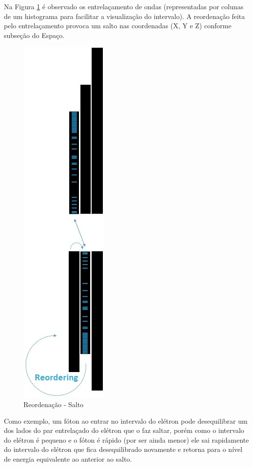 Na Figura \ref{fig:consciousness_space_subconscious_observation_jump} é observado os entrelaçamento de ondas (representadas por colunas de um histograma para facilitar a visualização do intervalo). A reordenação feita pelo entrelaçamento provoca um salto nas coordenadas (X, Y e Z) conforme subseção do Espaço.
	\begin{figure}[H]
	\caption{Reordenação - Salto}
	\label{fig:consciousness_space_subconscious_observation_jump}
	\centering
	\includegraphics[scale=.53]{sections/images/consciousness_space_subconscious_observation_jump.jpg}
	\end{figure}

Como exemplo, um fóton ao entrar no intervalo do elétron pode desequilibrar um dos lados do par entrelaçado do elétron que o faz saltar, porém como o intervalo do elétron é pequeno e o fóton é rápido (por ser ainda menor) ele sai rapidamente do intervalo do elétron que fica desequilibrado novamente e retorna para o nível de energia equivalente ao anterior ao salto.


